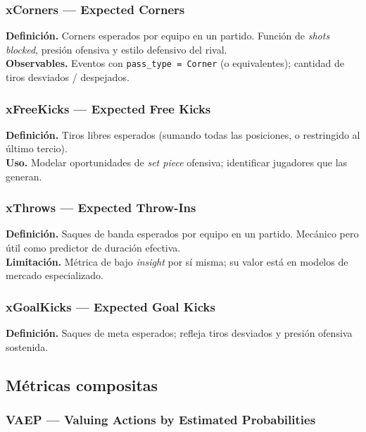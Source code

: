 \subsubsection{xCorners --- Expected Corners}

\textbf{Definición.} Corners esperados por equipo en un partido. Función de \emph{shots blocked}, presión ofensiva y estilo defensivo del rival.\\
\textbf{Observables.} Eventos con \texttt{pass\_type = Corner} (o equivalentes); cantidad de tiros desviados / despejados.

\subsubsection{xFreeKicks --- Expected Free Kicks}

\textbf{Definición.} Tiros libres esperados (sumando todas las posiciones, o restringido al último tercio).\\
\textbf{Uso.} Modelar oportunidades de \emph{set piece} ofensiva; identificar jugadores que las generan.

\subsubsection{xThrows --- Expected Throw-Ins}

\textbf{Definición.} Saques de banda esperados por equipo en un partido. Mecánico pero útil como predictor de duración efectiva.\\
\textbf{Limitación.} Métrica de bajo \emph{insight} por sí misma; su valor está en modelos de mercado especializado.

\subsubsection{xGoalKicks --- Expected Goal Kicks}

\textbf{Definición.} Saques de meta esperados; refleja tiros desviados y presión ofensiva sostenida.

\subsection{Métricas compositas}

\subsubsection{VAEP --- Valuing Actions by Estimated Probabilities}

